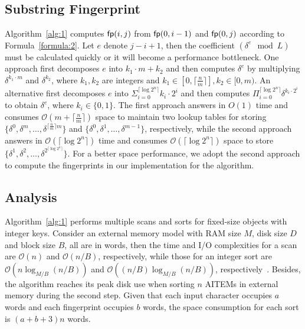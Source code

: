 \documentclass[10pt,journal,compsoc]{IEEEtran}
\begin{document}
	\subsection{Substring Fingerprint} \label{sec:method1:fingerprint}
	
	Algorithm~\ref{alg:1} computes ${\sf fp}(i, j)$ from ${\sf fp}(0, i - 1)$ and ${\sf fp}(0, j)$ according to Formula~\ref{formula:2}. Let $e$ denote $j - i + 1$, then the coefficient $(\delta^{e} \mod L)$ must be calculated quickly or it will become a performance bottleneck. One approach first decomposes $e$ into $k_1 \cdot m + k_2$ and then computes $\delta^{e}$ by multiplying $\delta^{k_1 \cdot m}$ and $\delta^{k_2}$, where $k_1, k_2$ are integers and $k_1 \in [0, \lceil \frac{n}{m} \rceil], k_2 \in [0, m)$. An alternative first decomposes $e$ into $\Sigma_{i = 0}^{\lceil \log2^n \rceil}{k_i \cdot 2^i}$ and then computes $\Pi_{i = 0}^{\lceil \log2^n \rceil}{\delta}^{k_i \cdot 2^i}$ to obtain $\delta^{e}$, where $k_i \in \{0, 1\}$. The first approach answers in ${O}(1)$ time and consumes $\mathcal{O}(m + \lceil \frac{n}{m} \rceil )$ space to maintain two lookup tables for storing $\{{\delta}^{0}, {\delta}^{m}, \dots, {\delta}^{\lceil \frac{n}{m} \rceil m}\}$ and $\{{\delta}^{0}, {\delta}^{1},\dots,{\delta}^{m - 1} \}$, respectively, while the second approach answers in $\mathcal{O}(\lceil \log2^n \rceil)$ time and consumes $\mathcal{O}(\lceil \log2^n \rceil)$ space to store $\{{\delta}^{1}, {\delta}^{2}, \dots, {\delta}^{2^{\lceil \log2^n \rceil}} \}$. For a better space performance, we adopt the second approach to compute the fingerprints in our implementation for the algorithm.
	
	
	\subsection{Analysis} \label{sec:method1:analysis}
	
	Algorithm~\ref{alg:1} performs multiple scans and sorts for fixed-size objects with integer keys.	Consider an external memory model with RAM size $M$, disk size $D$ and block size $B$, all are in words, then the time and I/O complexities for a scan are $\mathcal{O}(n)$ and $\mathcal{O}(n / B)$, respectively, while those for an integer sort are $\mathcal{O}(n\log_{M/ B}(n / B))$ and $\mathcal{O}((n / B)\log_{M / B}(n / B))$, respectively~\cite{Arge2013}. Besides, the algorithm reaches its peak disk use when sorting $n$ AITEMs in external memory during the second step. Given that each input character occupies $a$ words and each fingerprint occupies $b$ words, the space consumption for each sort is $(a + b + 3)n$ words.
	
\end{document}
